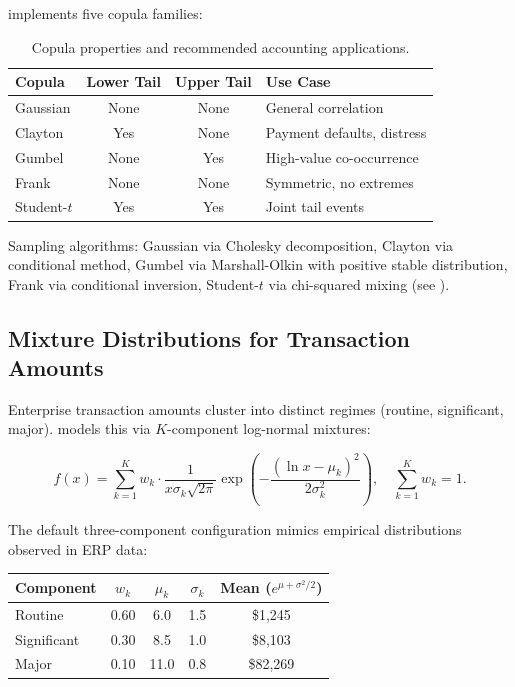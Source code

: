 \system{} implements five copula families:

\begin{table}[t]
\centering
\caption{Copula properties and recommended accounting applications.}
\label{tab:copula_summary}
\small
\begin{tabular}{lccl}
\toprule
\textbf{Copula} & \textbf{Lower Tail} & \textbf{Upper Tail}
  & \textbf{Use Case} \\
\midrule
Gaussian    & None & None & General correlation \\
Clayton     & Yes  & None & Payment defaults, distress \\
Gumbel      & None & Yes  & High-value co-occurrence \\
Frank       & None & None & Symmetric, no extremes \\
Student-$t$ & Yes  & Yes  & Joint tail events \\
\bottomrule
\end{tabular}
\end{table}

Sampling algorithms: Gaussian via Cholesky decomposition, Clayton via
conditional method, Gumbel via Marshall-Olkin with positive stable
distribution, Frank via conditional inversion, Student-$t$ via
chi-squared mixing (see ).

\subsection{Mixture Distributions for Transaction Amounts}
\label{sec:stat_mixture}

Enterprise transaction amounts cluster into distinct regimes (routine,
significant, major).  \system{} models this via $K$-component
log-normal mixtures:

\begin{equation}
f(x) = \sum_{k=1}^{K} w_k \cdot \frac{1}{x\sigma_k\sqrt{2\pi}}
  \exp\!\left(-\frac{(\ln x - \mu_k)^2}{2\sigma_k^2}\right),
  \quad \sum_{k=1}^{K} w_k = 1.
\label{eq:lognormal_mixture}
\end{equation}

The default three-component configuration mimics empirical distributions
observed in ERP data:

\begin{center}
\begin{tabular}{lcccc}
\toprule
\textbf{Component} & $w_k$ & $\mu_k$ & $\sigma_k$
  & \textbf{Mean} ($e^{\mu+\sigma^2/2}$) \\
\midrule
Routine     & 0.60 & 6.0 & 1.5 & \$1{,}245 \\
Significant & 0.30 & 8.5 & 1.0 & \$8{,}103 \\
Major       & 0.10 & 11.0 & 0.8 & \$82{,}269 \\
\bottomrule
\end{tabular}
\end{center}

